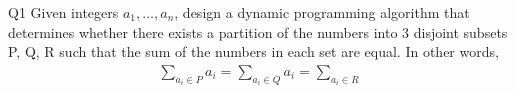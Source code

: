 \begin{problem}
  {Q1}
  Given integers $a_1, \dots , a_n$, design a dynamic programming algorithm that determines
  whether there exists a partition of the numbers into 3 disjoint subsets P, Q, R such that the sum
  of the numbers in each set are equal. In other words,
  \begin{align*}
      \sum_{a_i \in P} a_i = \sum_{a_i \in Q} a_i = \sum_{a_i \in R}
  \end{align*}
\end{problem}

